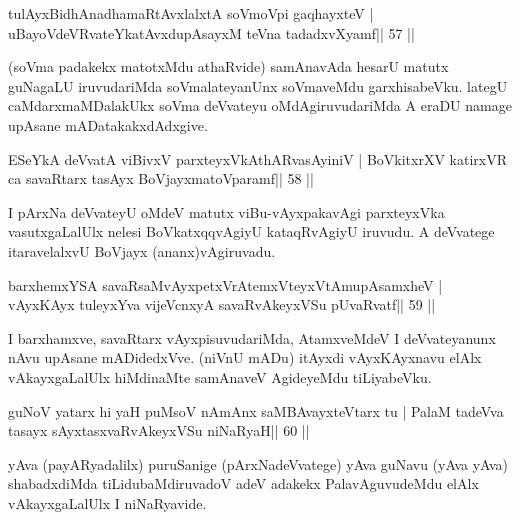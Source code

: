 \begin{shl}
tulAyxBidhAnadhamaRtAvxlalxtA soVmoV\s pi gaqhayxteV |
uBayoVdeVRvateYkatAvxdupAsayxM teVna tadadxvXyamf\hfill || 57 ||
\end{shl}

\begin{artha}
(soVma padakekx matotxMdu athaRvide) samAnavAda hesarU matutx guNagaLU  iruvudariMda soVmalateyanUnx soVmaveMdu garxhisabeVku. lategU  caMdarxmaMDalakUkx soVma deVvateyu oMdAgiruvudariMda A eraDU namage upAsane mADatakakxdAdxgive.
\end{artha}

\begin{shl}
ESeYkA deVvatA viBivxV parxteyxVkAthARvasAyiniV |
BoVkitxrXV katirxVR ca savaRtarx tasAyx BoVjayxmatoV\s paramf\hfill || 58 ||
\end{shl}

\begin{artha}
I pArxNa deVvateyU oMdeV matutx viBu-vAyxpakavAgi parxteyxVka  vasutxgaLalUlx nelesi BoVkatxqqvAgiyU kataqRvAgiyU iruvudu. A deVvatege itaravelalxvU BoVjayx (ananx)vAgiruvadu.
\end{artha}

\begin{shl}
barxhemxYSA savaRsaMvAyxpetxVrAtemxVteyxVtAmupAsamxheV |
vAyxKAyx tuleyxYva vijeVcnxyA savaRvAkeyxVSu pUvaRvatf\hfill || 59 ||
\end{shl}

\begin{artha}
I barxhamxve, savaRtarx vAyxpisuvudariMda, AtamxveMdeV I deVvateyanunx nAvu upAsane mADidedxVve. (niVnU mADu) itAyxdi vAyxKAyxnavu elAlx vAkayxgaLalUlx hiMdinaMte samAnaveV AgideyeMdu tiLiyabeVku.
\end{artha}


\begin{shl}
guNoV yatarx hi yaH puMsoV nAmAnx saMBAvayxteV\s tarx tu |
PalaM tadeVva tasayx sAyxtasxvaRvAkeyxVSu niNaRyaH\hfill || 60 ||
\end{shl}

\begin{artha}
yAva (payARyadalilx) puruSanige (pArxNadeVvatege) yAva guNavu (yAva yAva) shabadxdiMda tiLidubaMdiruvadoV adeV adakekx PalavAguvudeMdu elAlx vAkayxgaLalUlx I niNaRyavide.
\end{artha}

